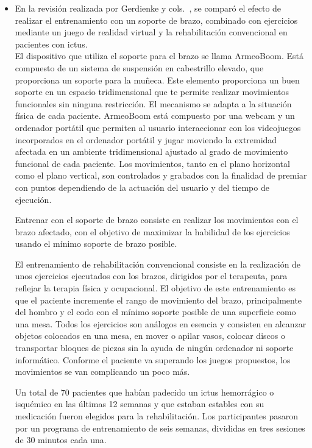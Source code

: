 \begin{itemize}
    \item En la revisión realizada por Gerdienke y cols.~\cite{doi:10.1177/1545968314535985}, se comparó el efecto de realizar el entrenamiento con un soporte de brazo, combinado con ejercicios mediante un juego de realidad virtual y la rehabilitación convencional en pacientes con ictus.\\ El dispositivo que utiliza el soporte para el brazo se llama ArmeoBoom. Está compuesto de un sistema de suspensión en cabestrillo elevado, que proporciona un soporte para la muñeca. Este elemento proporciona un buen soporte en un espacio tridimensional que te permite realizar movimientos funcionales sin ninguna restricción. El mecanismo se adapta a la situación física de cada paciente. ArmeoBoom está compuesto por una webcam y un ordenador portátil que permiten al usuario interaccionar con los videojuegos incorporados en el ordenador portátil y jugar moviendo la extremidad afectada en un ambiente tridimensional ajustado al grado de movimiento funcional de cada paciente. Los movimientos, tanto en el plano horizontal como el plano vertical, son controlados y grabados con la finalidad de premiar con puntos dependiendo de la actuación del usuario y del tiempo de ejecución.
    
    Entrenar con el soporte de brazo consiste en realizar los movimientos con el brazo afectado, con el objetivo de maximizar la habilidad de los ejercicios usando el mínimo soporte de brazo posible.
    
    El entrenamiento de rehabilitación convencional consiste en la realización de unos ejercicios ejecutados con los brazos, dirigidos por el terapeuta, para reflejar la terapia física y ocupacional. El objetivo de este entrenamiento es que el paciente incremente el rango de movimiento del brazo, principalmente del hombro y el codo con el mínimo soporte posible de una superficie como una mesa. Todos los ejercicios son análogos en esencia y consisten en alcanzar objetos colocados en una mesa, en mover o apilar vasos, colocar discos o transportar bloques de piezas sin la ayuda de ningún ordenador ni soporte informático. Conforme el paciente va superando los juegos propuestos, los movimientos se van complicando un poco más.

    Un total de 70 pacientes que habían padecido un ictus hemorrágico o isquémico en las últimas 12 semanas y que estaban estables con su medicación fueron elegidos para la rehabilitación. Los participantes pasaron por un programa de entrenamiento de seis semanas, divididas en tres sesiones de 30 minutos cada una.
    

\end{itemize}
